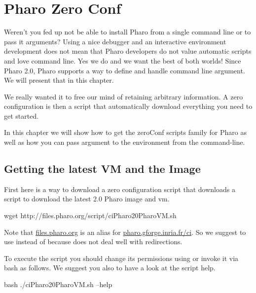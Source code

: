 \documentclass[a4paper,10pt,twoside]{book}
\begin{document}
\fi
\sloppy

\chapter{Pharo Zero Conf}

Weren't you fed up not be able to install Pharo from a single command line or to pass it arguments? 
Using a nice debugger and an interactive environment development does not 
mean that Pharo developers do not value automatic scripts and love command line. Yes we do and we want the best of
both worlds!
Since Pharo 2.0, Pharo supports a way to define and handle command line argument. 
We will present that in this chapter. 

We really wanted it to free our mind of retaining arbitrary information. 
A zero configuration is then a script that automatically download everything you need to get started. 

In this chapter we will show how to get the zeroConf scripts family for Pharo as well as how you can 
pass argument to the environment from the command-line.



\section{Getting the latest VM and the Image}
First here is a way to download a zero configuration script that downloads a script to download the latest 2.0 Pharo image and vm. 

\begin{code}{}
wget http://files.pharo.org/script/ciPharo20PharoVM.sh
\end{code}

Note that \url{files.pharo.org} is an alias for \url{pharo.gforge.inria.fr/ci}. So we suggest to use  instead of  because  does not deal
well with redirections.

To execute the script you should change its  permissions using   or invoke it via bash as follows. We
suggest you also to have a look at the script help.

\begin{code}{}
bash ./ciPharo20PharoVM.sh --help 
\end{code}
\end{document}
